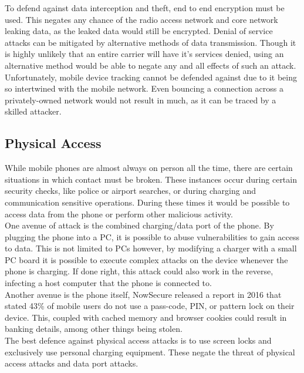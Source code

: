 To defend against data interception and theft, end to end encryption must be used.
This negates any chance of the radio access network and core network leaking data, as the leaked data would still be encrypted.
Denial of service attacks can be mitigated by alternative methods of data transmission.
Though it is highly unlikely that an entire carrier will have it’s services denied, using an alternative method would be able to negate any and all effects of such an attack.
Unfortunately, mobile device tracking cannot be defended against due to it being so intertwined with the mobile network.
Even bouncing a connection across a privately-owned network would not result in much, as it can be traced by a skilled attacker.\cite{Reference13}


\subsection{Physical Access}

\label{Ch2 Sec2 Sub4}

While mobile phones are almost always on person all the time, there are certain situations in which contact must be broken.
These instances occur during certain security checks, like police or airport searches, or during charging and communication sensitive operations.
During these times it would be possible to access data from the phone or perform other malicious activity.\\
One avenue of attack is the combined charging/data port of the phone.
By plugging the phone into a PC, it is possible to abuse vulnerabilities to gain access to data.
This is not limited to PCs however, by modifying a charger with a small PC board it is possible to execute complex attacks on the device whenever the phone is charging.
If done right, this attack could also work in the reverse, infecting a host computer that the phone is connected to.\cite{Reference13}\\
Another avenue is the phone itself, NowSecure released a report in 2016 that stated 43\% of mobile users do not use a pass-code, PIN, or pattern lock on their device.\cite{Reference18}
This, coupled with cached memory and browser cookies could result in banking details, among other things being stolen.\\

The best defence against physical access attacks is to use screen locks and exclusively use personal charging equipment.
These negate the threat of physical access attacks and data port attacks.\\

